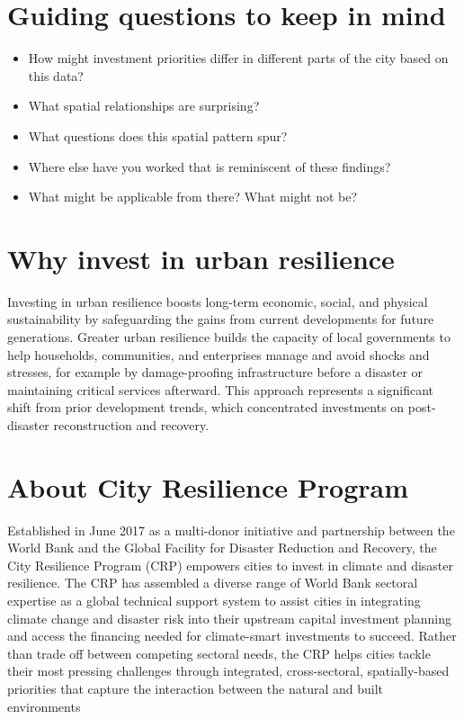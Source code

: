 \documentclass[
  letterpaper,
  DIV=11,
  numbers=noendperiod]{scrreprt}
\providecommand{\tightlist}{%
  \setlength{\itemsep}{0pt}\setlength{\parskip}{0pt}}
\begin{document}
\section{Guiding questions to keep in
mind}\label{guiding-questions-to-keep-in-mind}

\begin{itemize}
\tightlist
\item
  How might investment priorities differ in different parts of the city
  based on this data?
\item
  What spatial relationships are surprising?
\item
  What questions does this spatial pattern spur?
\item
  Where else have you worked that is reminiscent of these findings?
\item
  What might be applicable from there? What might not be?
\end{itemize}

\section{Why invest in urban
resilience}\label{why-invest-in-urban-resilience}

Investing in urban resilience boosts long-term economic, social, and
physical sustainability by safeguarding the gains from current
developments for future generations. Greater urban resilience builds the
capacity of local governments to help households, communities, and
enterprises manage and avoid shocks and stresses, for example by
damage-proofing infrastructure before a disaster or maintaining critical
services afterward. This approach represents a significant shift from
prior development trends, which concentrated investments on
post-disaster reconstruction and recovery.

\section{About City Resilience
Program}\label{about-city-resilience-program}

Established in June 2017 as a multi-donor initiative and partnership
between the World Bank and the Global Facility for Disaster Reduction
and Recovery, the City Resilience Program (CRP) empowers cities to
invest in climate and disaster resilience. The CRP has assembled a
diverse range of World Bank sectoral expertise as a global technical
support system to assist cities in integrating climate change and
disaster risk into their upstream capital investment planning and access
the financing needed for climate-smart investments to succeed. Rather
than trade off between competing sectoral needs, the CRP helps cities
tackle their most pressing challenges through integrated,
cross-sectoral, spatially-based priorities that capture the interaction
between the natural and built environments
\end{document}
